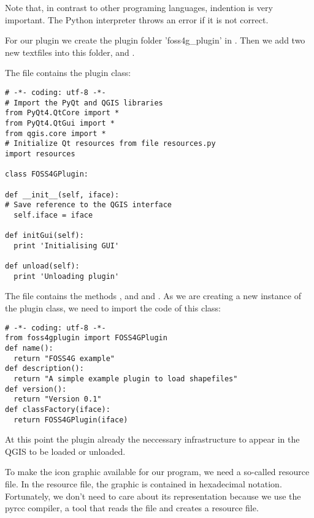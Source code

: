 Note that, in contrast to other programing languages, indention is very
important. The Python interpreter throws an error if it is not correct.

For our plugin we create the plugin folder 'foss4g\_plugin' in
. Then we add two new textfiles into this
folder,  and .

The file  contains the plugin class:

\begin{verbatim}
# -*- coding: utf-8 -*-
# Import the PyQt and QGIS libraries
from PyQt4.QtCore import *
from PyQt4.QtGui import *
from qgis.core import *
# Initialize Qt resources from file resources.py
import resources

class FOSS4GPlugin:

def __init__(self, iface):
# Save reference to the QGIS interface
  self.iface = iface

def initGui(self):
  print 'Initialising GUI'

def unload(self):
  print 'Unloading plugin'
\end{verbatim}

The file  contains the methods ,
 and  and . As
we are creating a new instance of the plugin class, we need to import the
code of this class:

\begin{verbatim}
# -*- coding: utf-8 -*-
from foss4gplugin import FOSS4GPlugin
def name():
  return "FOSS4G example"
def description():
  return "A simple example plugin to load shapefiles"
def version():
  return "Version 0.1"
def classFactory(iface):
  return FOSS4GPlugin(iface)
\end{verbatim}

At this point the plugin already the neccessary infrastructure to appear in
the QGIS  to be
loaded or unloaded. 


To make the icon graphic available for our program, we need a so-called
resource file. In the resource file, the graphic is contained in hexadecimal
notation. Fortunately, we don't need to care about its representation because
we use the pyrcc compiler, a tool that reads the file
 and creates a resource file. 

